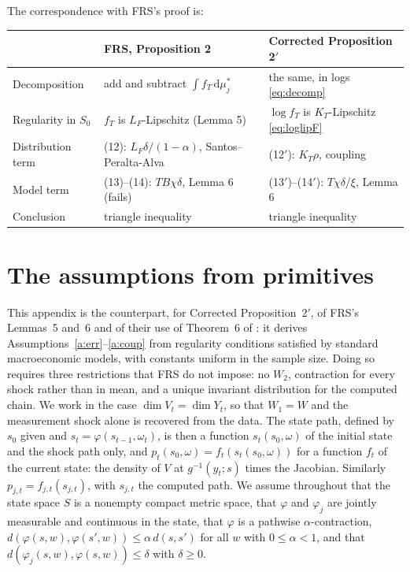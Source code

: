 \documentclass[11pt]{article}
\theoremstyle{definition}
\theoremstyle{remark}
\newcommand{\dd}{\mathrm{d}}
\begin{document}
\medskip
\noindent The correspondence with FRS's proof is:

\begin{center}
\small
\begin{tabular}{@{}lll@{}}
\toprule
& FRS, Proposition 2 & Corrected Proposition 2$'$ \\
\midrule
Decomposition & add and subtract $\int f_T\,\dd\mu_j^*$ & the same, in logs \eqref{eq:decomp} \\
Regularity in $S_0$ & $f_T$ is $L_F$-Lipschitz (Lemma 5) & $\log f_T$ is $K_T$-Lipschitz
  \eqref{eq:loglipF} \\
Distribution term & (12): $L_F\delta/(1-\alpha)$, Santos--Peralta-Alva & (12$'$): $K_T\rho$,
  coupling \\
Model term & (13)--(14): $TB\chi\delta$, Lemma 6 (fails) & (13$'$)--(14$'$): $T\chi\delta/\xi$,
  Lemma 6 \\
Conclusion & triangle inequality & triangle inequality \\
\bottomrule
\end{tabular}
\end{center}

\section{The assumptions from primitives}\label{app:prim}

This appendix is the counterpart, for Corrected Proposition~2$'$, of FRS's Lemmas~5 and~6 and of
their use of Theorem~6 of \citet{SantosPeraltaAlva2005}: it derives
Assumptions~\ref{a:err}--\ref{a:coup} from regularity conditions satisfied by standard
macroeconomic models, with constants uniform in the
sample size. Doing so requires three restrictions that FRS do not impose: no $W_2$, contraction
for every shock rather than in mean, and a unique invariant distribution for the computed chain.
We work in the case $\dim V_t = \dim Y_t$, so
that $W_1 = W$ and the measurement shock alone is recovered from the data. The state path,
defined by $s_0$ given and $s_{t} = \varphi(s_{t-1},\omega_t)$, is then a function
$s_t(s_0,\omega)$ of the initial state and the shock path only, and
$p_t(s_0,\omega) = f_t(s_{t}(s_0,\omega))$ for a function $f_t$ of the current state: the density
of $V$ at $g^{-1}(y_t; s)$ times the Jacobian. Similarly $p_{j,t} = f_{j,t}(s_{j,t})$, with $s_{j,t}$
the computed path. We assume throughout that the state space $S$ is a nonempty compact metric
space, that $\varphi$ and $\varphi_j$ are jointly measurable and continuous in the state, that
$\varphi$ is a pathwise $\alpha$-contraction, $d(\varphi(s,w), \varphi(s',w)) \le \alpha\,d(s,s')$
for all $w$ with $0 \le \alpha < 1$, and that $d(\varphi_j(s,w), \varphi(s,w)) \le \delta$ with
$\delta \ge 0$.
\end{document}
